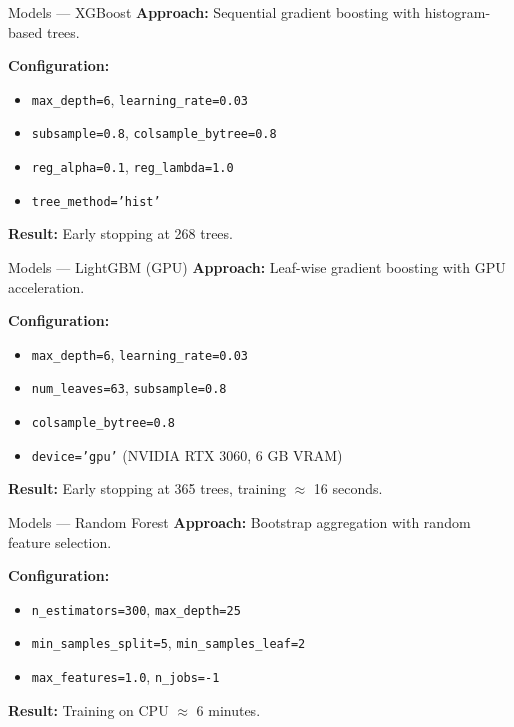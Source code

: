 \documentclass[aspectratio=169, 12pt]{beamer}
\begin{document}
\begin{frame}{Models --- XGBoost}
  \textbf{Approach:} Sequential gradient boosting with histogram-based trees.

  \medskip
  \textbf{Configuration:}
  \begin{itemize}
    \item \texttt{max\_depth=6},\; \texttt{learning\_rate=0.03}
    \item \texttt{subsample=0.8},\; \texttt{colsample\_bytree=0.8}
    \item \texttt{reg\_alpha=0.1},\; \texttt{reg\_lambda=1.0}
    \item \texttt{tree\_method='hist'}
  \end{itemize}

  \medskip
  \textbf{Result:} Early stopping at 268 trees.
\end{frame}

\begin{frame}{Models --- LightGBM (GPU)}
  \textbf{Approach:} Leaf-wise gradient boosting with GPU acceleration.

  \medskip
  \textbf{Configuration:}
  \begin{itemize}
    \item \texttt{max\_depth=6},\; \texttt{learning\_rate=0.03}
    \item \texttt{num\_leaves=63},\; \texttt{subsample=0.8}
    \item \texttt{colsample\_bytree=0.8}
    \item \texttt{device='gpu'} (NVIDIA RTX 3060, 6 GB VRAM)
  \end{itemize}

  \medskip
  \textbf{Result:} Early stopping at 365 trees, training $\approx$ 16 seconds.
\end{frame}

\begin{frame}{Models --- Random Forest}
  \textbf{Approach:} Bootstrap aggregation with random feature selection.

  \medskip
  \textbf{Configuration:}
  \begin{itemize}
    \item \texttt{n\_estimators=300},\; \texttt{max\_depth=25}
    \item \texttt{min\_samples\_split=5},\; \texttt{min\_samples\_leaf=2}
    \item \texttt{max\_features=1.0},\; \texttt{n\_jobs=-1}
  \end{itemize}

  \medskip
  \textbf{Result:} Training on CPU $\approx$ 6 minutes.
\end{frame}
\end{document}
